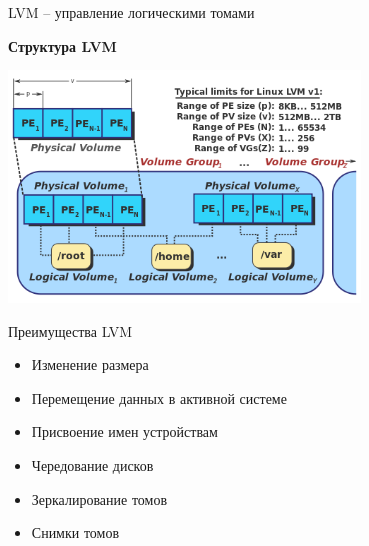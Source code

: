 \begin{frame}{LVM -- управление логическими томами}
  \begin{center}
    \textbf{Структура LVM}
  \end{center}
  \includegraphics[width=0.7\textwidth]{../../slides/disk/LVM1-wiki.png}
\end{frame}

\begin{frame}{Преимущества LVM}
	\begin{itemize}
		\item Изменение размера
		\item Перемещение данных в активной системе
		\item Присвоение имен устройствам
		\item Чередование дисков
		\item Зеркалирование томов
		\item Снимки томов
	\end{itemize}
\end{frame}
 

